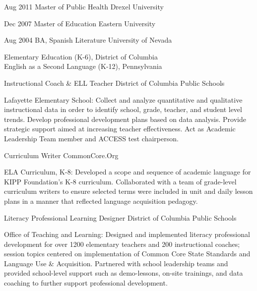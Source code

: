 \documentclass[]{scrartcl}
\begin{document}
\begin{cleanCV}
\WorkExperience
{Aug 2011}
{Master of Public Health}
{Drexel University}

\WorkExperience
{Dec 2007}
{Master of Education}
{Eastern University}

\WorkExperience
{Aug 2004}
{BA, Spanish Literature}
{University of Nevada}

\vspace{-1.0em}
Elementary Education (K-6), District of Columbia\\
English as a Second Language (K-12), Pennsylvania

\vspace{1.25em}

{Instructional Coach \& ELL Teacher}
{District of Columbia Public Schools}

\JobDesc
{Lafayette Elementary School: }
{Collect and analyze quantitative and qualitative instructional data in order to identify school, grade, teacher, and student level trends. Develop professional development plans based on data analysis. Provide strategic support aimed at increasing teacher effectiveness. Act as Academic Leadership Team member and ACCESS test chairperson.}

{Curriculum Writer}
{CommonCore.Org}

\JobDesc
{ELA Curriculum, K-8: }
{Developed a scope and sequence of academic language for KIPP Foundation's K-8 curriculum. Collaborated with a team of grade-level curriculum writers to ensure selected terms were included in unit and daily lesson plans in a manner that reflected language acquisition pedagogy.}

{Literacy Professional Learning Designer}
{District of Columbia Public Schools}

\JobDesc
{Office of Teaching and Learning: }
{Designed and implemented literacy professional development for over 1200 elementary teachers and 200 instructional coaches; session topics centered on implementation of Common Core State Standards and Language Use \& Acquisition. Partnered with school leadership teams and provided school-level support such as demo-lessons, on-site trainings, and data coaching to further support professional development.}




\end{cleanCV}
\end{document}
